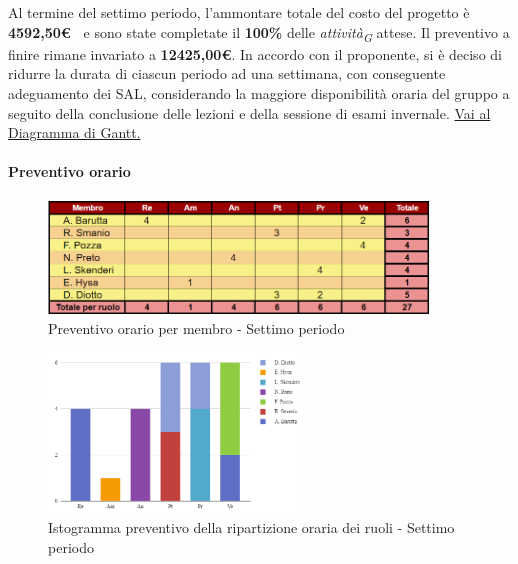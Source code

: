 Al termine del settimo periodo, l'ammontare totale del costo del progetto è \textbf{ 4592,50\euro\ } e sono state completate il \textbf{100\%} delle \textit{attività}\textsubscript{\textit{G}} attese.
Il preventivo a finire rimane invariato a \textbf{12425,00€}.
In accordo con il proponente, si è deciso di ridurre la durata di ciascun periodo ad una settimana, con conseguente adeguamento dei SAL, considerando la maggiore disponibilità oraria del gruppo a seguito della conclusione delle lezioni e della sessione di esami invernale.
\href{https://github.com/orgs/ByteOps-swe/projects/3/views/1?sortedBy%5Bdirection%5D=asc&sortedBy%5BcolumnId%5D=64182560}{Vai al Diagramma di Gantt.}

\pagebreak

\paragraph{Preventivo orario}

\begin{figure}[H] 
    \centering
    \includegraphics[width=0.9\textwidth]{../Images/preventivoOrario7Periodo.png}
    \caption{Preventivo orario per membro - Settimo periodo}
    \label{fig:Preventivo_orario_7}
\end{figure}

\vspace{0.6cm}

\begin{figure}[H]
    \centering
    \includegraphics[width=0.6\textwidth]{../Images/preventivoDivisioneRuoli7Periodo.png}
    \caption{Istogramma preventivo della ripartizione oraria dei ruoli - Settimo periodo}
    \label{fig:Preventivo_ripartizione_oraria_7}
\end{figure}

